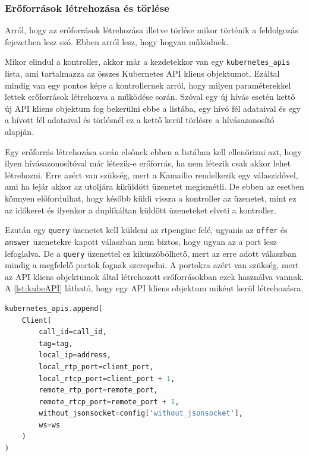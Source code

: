 \subsubsection{Erőforrások létrehozása és törlése}

Arról, hogy az erőforrások létrehozása illetve törlése mikor történik a feldolgozás
fejezetben lesz szó. Ebben arról lesz, hogy hogyan működnek.

Mikor elindul a kontroller, akkor már a kezdetekkor van egy \texttt{kubernetes\_apis}
lista, ami tartalmazza az összes Kubernetes API kliens objektumot. Ezáltal mindig van egy
pontos képe a kontrollernek arról, hogy milyen paraméterekkel lettek erőforrások 
létrehozva a működése során. Szóval egy új hívás esetén kettő új API kliens objektum 
fog bekerülni ebbe a listába, egy hívó fél adataival és egy a hívott fél adataival 
és törlésnél ez a kettő kerül törlésre a hívásazonosító alapján. 

Egy erőforrás létrehozása során elsőnek ebben a listában kell ellenőrizni azt, hogy
ilyen hívásazonosítóval már létezik-e erőforrás, ha nem létezik csak akkor lehet 
létrehozni. Erre azért van szükség, mert a Kamailio rendelkezik egy válaszidővel, ami ha 
lejár akkor az utoljára kiküldött üzenetet megismétli. De ebben az esetben könnyen 
előfordulhat, hogy később küldi vissza a kontroller az üzenetet, mint ez az időkeret és 
ilyenkor a duplikáltan küldött üzeneteket elveti a kontroller.

Ezután egy \texttt{query} üzenetet kell küldeni az rtpengine felé, ugyanis az 
\texttt{offer} és \texttt{answer} üzenetekre kapott válaszban nem biztos, hogy ugyan
az a port lesz lefoglalva. De a \texttt{query} üzenettel ez kiküszöbölhető, mert az 
erre adott válaszban mindig a megfelelő portok fognak szerepelni. A portokra azért van
szükség, mert az API kliens objektumok által létrehozott erőforrásokban ezek használva
vannak. A \ref{lst:kubeAPI} látható, hogy egy API kliens objektum miként kerül 
létrehozásra.

\begin{lstlisting}[language=python, caption=Kubernetes API kliens objektum létrehozása, label=lst:kubeAPI]
kubernetes_apis.append(
    Client(
        call_id=call_id,
        tag=tag,
        local_ip=address,
        local_rtp_port=client_port,
        local_rtcp_port=client_port + 1,
        remote_rtp_port=remote_port,
        remote_rtcp_port=remote_port + 1,
        without_jsonsocket=config['without_jsonsocket'],
        ws=ws
    )
)
\end{lstlisting}

